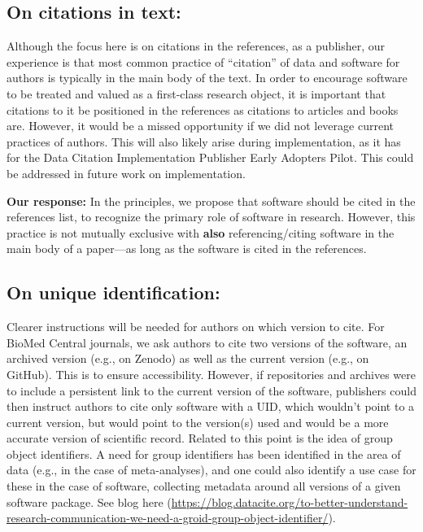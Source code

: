 \documentclass[12pt, oneside]{amsart}
\begin{document}
\subsection{On citations in text:} Although the focus here is on citations in the references, as a publisher, our experience is that most common practice of ``citation'' of data and software for authors is typically in the main body of the text. In order to encourage software to be treated and valued as a first-class research object, it is important that citations to it be positioned in the references as citations to articles and books are. However, it would be a missed opportunity if we did not leverage current practices of authors. This will also likely arise during implementation, as it has for the Data Citation Implementation Publisher Early Adopters Pilot. This could be addressed in future work on implementation.

\textbf{Our response:} In the principles, we propose that software should be cited in the references list, to recognize the primary role of software in research. However, this practice is not mutually exclusive with \textbf{also} referencing\slash citing software in the main body of a paper---as long as the software is cited in the references.

\subsection{On unique identification:} Clearer instructions will be needed for authors on which version to cite. For BioMed Central journals, we ask authors to cite two versions of the software, an archived version (e.g., on Zenodo) as well as the current version (e.g., on GitHub). This is to ensure accessibility. However, if repositories and archives were to include a persistent link to the current version of the software, publishers could then instruct authors to cite only software with a UID, which wouldn't point to a current version, but would point to the version(s) used and would be a more accurate version of scientific record. Related to this point is the idea of group object identifiers. A need for group identifiers has been identified in the area of data (e.g., in the case of meta-analyses), and one could also identify a use case for these in the case of software, collecting metadata around all versions of a given software package. See blog here (\url{https://blog.datacite.org/to-better-understand-research-communication-we-need-a-groid-group-object-identifier/}).
\end{document}
